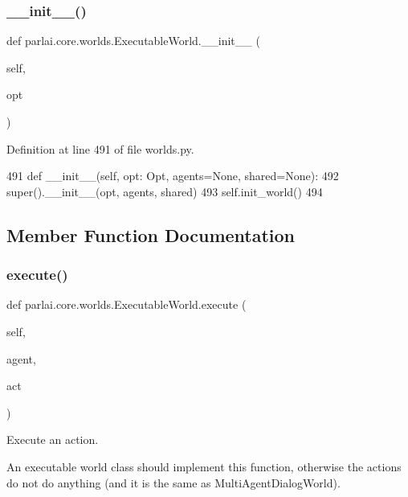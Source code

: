 \subsubsection{\texorpdfstring{\+\_\+\+\_\+init\+\_\+\+\_\+()}{\_\_init\_\_()}}
{\footnotesize\ttfamily def parlai.\+core.\+worlds.\+Executable\+World.\+\_\+\+\_\+init\+\_\+\+\_\+ (\begin{DoxyParamCaption}\item[{}]{self,  }\item[{}]{opt }\end{DoxyParamCaption})}



Definition at line 491 of file worlds.\+py.


\begin{DoxyCode}
491     \textcolor{keyword}{def }\_\_init\_\_(self, opt: Opt, agents=\textcolor{keywordtype}{None}, shared=\textcolor{keywordtype}{None}):
492         super().\_\_init\_\_(opt, agents, shared)
493         self.init\_world()
494 
\end{DoxyCode}


\subsection{Member Function Documentation}
\mbox{\label{classparlai_1_1core_1_1worlds_1_1ExecutableWorld_a318fbf7c75178f62a6d46647f1a063fa}} 
\subsubsection{\texorpdfstring{execute()}{execute()}}
{\footnotesize\ttfamily def parlai.\+core.\+worlds.\+Executable\+World.\+execute (\begin{DoxyParamCaption}\item[{}]{self,  }\item[{}]{agent,  }\item[{}]{act }\end{DoxyParamCaption})}

\begin{DoxyVerb}Execute an action.

An executable world class should implement this function, otherwise the actions
do not do anything (and it is the same as MultiAgentDialogWorld).
\end{DoxyVerb}
 


